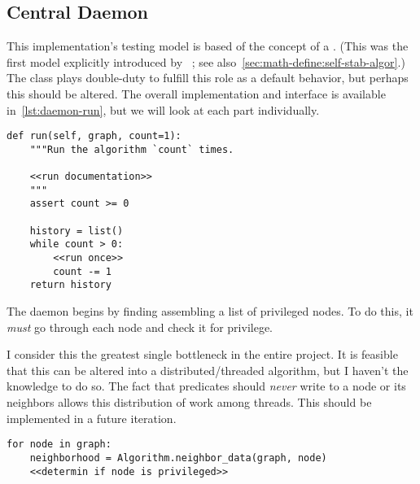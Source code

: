 \subsection{Central Daemon}
\label{sec:logic-repr:daemon}

This implementation's testing model is based of the concept of a .
(This was the first model explicitly introduced
  by \citeauthor{dew:sem}~\autocite{dew:sem}; see also~\autoref{sec:math-define:self-stab-algor}.)
The  class plays double-duty to fulfill this role as a default behavior,
  but perhaps this should be altered.
The overall implementation and interface is available in~\autoref{lst:daemon-run},
  but we will look at each part individually.

\begin{lstlisting}[float=p, caption={A generalized run of a self-stabilizing algorithm.}, label={lst:daemon-run}]
def run(self, graph, count=1):
    """Run the algorithm `count` times.

    <<run documentation>>
    """
    assert count >= 0

    history = list()
    while count > 0:
        <<run once>>
        count -= 1
    return history
\end{lstlisting}

The daemon begins by finding assembling a list of privileged nodes.
To do this, it \emph{must} go through each node and check it for privilege.
\begin{warning}
  I consider this the greatest single bottleneck in the entire project.
  It is feasible that this can be altered into a distributed\slash threaded algorithm,
    but I haven't the knowledge to do so.
  The fact that predicates should \emph{never} write to a node or its neighbors
    allows this distribution of work among threads.
  This should be implemented in a future iteration.
\end{warning}

\begin{lstlisting}[float=p, caption={Finding privileged nodes.}, label={lst:daemon-find-privileged-nodes}]
for node in graph:
    neighborhood = Algorithm.neighbor_data(graph, node)
    <<determin if node is privileged>>
\end{lstlisting}

